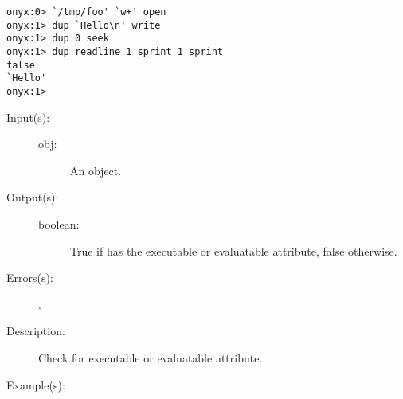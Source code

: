 \begin{description}
\begin{description}
\begin{verbatim}
onyx:0> `/tmp/foo' `w+' open
onyx:1> dup `Hello\n' write
onyx:1> dup 0 seek
onyx:1> dup readline 1 sprint 1 sprint
false
`Hello'
onyx:1>
		\end{verbatim}
	\end{description}
\label{systemdict:xcheck}
\item[{\onyxop{obj}{xcheck}{boolean}}: ]
	\begin{description}\item[]
	\item[Input(s): ]
		\begin{description}\item[]
		\item[obj: ]
			An object.
		\end{description}
	\item[Output(s): ]
		\begin{description}\item[]
		\item[boolean: ]
			True if  has the executable or evaluatable
			attribute, false otherwise.
		\end{description}
	\item[Errors(s): ]
		\begin{description}\item[]
		\item[.]
		\end{description}
	\item[Description: ]
		Check  for executable or evaluatable attribute.
	\item[Example(s): ]\begin{verbatim}


\end{verbatim}
\end{description}
\end{description}
